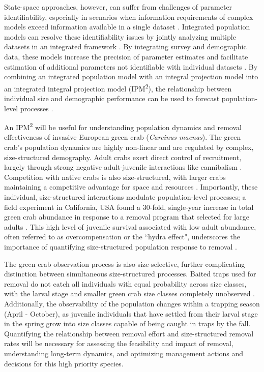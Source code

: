 \documentclass{article}
\begin{document}
State-space approaches, however, can suffer from challenges of parameter identifiability, especially in scenarios when information requirements of complex models exceed information available in a single dataset \parencite{auger2016state, knape2008estimability}. Integrated population models can resolve these identifiability issues by jointly analyzing multiple datasets in an integrated framework \parencite{besbeas2002integrating}. By integrating survey and demographic data, these models increase the precision of parameter estimates and facilitate estimation of additional parameters not identifiable with individual datasets \parencite{riecke2019integrated, abadi2010assessment}. By combining an integrated population model with an integral projection model into an integrated integral projection model (IPM\textsuperscript{2}), the relationship between individual size and demographic performance can be used to forecast population-level processes \parencite{plard2019ipm}.

An IPM\textsuperscript{2} will be useful for understanding population dynamics and removal effectiveness of invasive European green crab (\textit{Carcinus maenas}). The green crab’s population dynamics are highly non-linear and are regulated by complex, size-structured demography. Adult crabs exert direct control of recruitment, largely through strong negative adult-juvenile interactions like cannibalism
\parencite{grosholz2021stage, romano2017cannibalism}. Competition with native crabs is also size-structured, with larger crabs maintaining a competitive advantage for space and resources \parencite{mcdonald2001competitive, jensen2007biotic}. Importantly, these individual, size-structured interactions modulate population-level processes; a field experiment in California, USA found a 30-fold, single-year increase in total green crab abundance in response to a removal program that selected for large adults \parencite{grosholz2021stage}. This high level of juvenile survival associated with low adult abundance, often referred to as overcompensation or the ``hydra effect", underscores the importance of quantifying size-structured population response to removal \parencite{abrams2009does}. 

The green crab observation process is also size-selective, further complicating distinction between simultaneous size-structured processes. Baited traps used for removal do not catch all individuals with equal probability across size classes, with the larval stage and smaller green crab size classes completely unobserved \parencite{jorgensen2009size}. Additionally, the observability of the population changes within a trapping season (April - October), as juvenile individuals that have settled from their larval stage in the spring grow into size classes capable of being caught in traps by the fall. Quantifying the relationship between removal effort and size-structured removal rates will be necessary for assessing the feasibility and impact of removal, understanding long-term dynamics, and optimizing management actions and decisions for this high priority species. 
\end{document}
